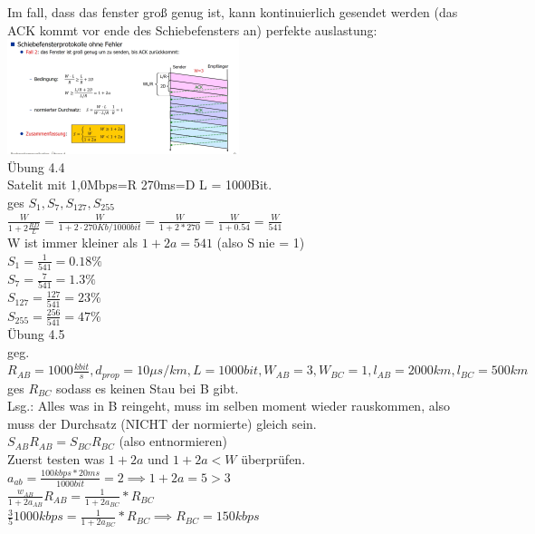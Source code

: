 \documentclass{article}
\begin{document}
	Im fall, dass das fenster groß genug ist, kann kontinuierlich gesendet werden (das ACK kommt vor ende des Schiebefensters an) perfekte auslastung:\\
	\includegraphics[width=256px]{GOBACKNlargeWindow.png}\\
	Übung 4.4\\
	Satelit mit 1,0Mbps=R 270ms=D L = 1000Bit.\\
	ges $S_1, S_7, S_{127},S_{255}$\\
	$\frac{W}{1+2\frac{RD}{L}} = \frac{W}{1+2\cdot 270Kb/1000bit} = \frac{W}{1+2*270}=\frac{W}{1+0.54} = \frac{W}{541}$\\
	W ist immer kleiner als $1+2a=541$ (also S nie = 1)\\
	$S_1 = \frac{1}{541} = 0.18\%$\\
	$S_7 = \frac{7}{541}= 1.3\%$\\
	$S_{127}= \frac{127}{541}= 23\%$\\
	$S_{255}= \frac{256}{541}=47\%$\\
	Übung 4.5\\
	geg.\\
	$R_{AB} = 1000\frac{kbit}{s}, d_{prop} = 10\mu s/km, L=1000bit, W_{AB} = 3, W_{BC}=1, l_{AB}=2000km, l_{BC} = 500km$\\
	ges $R_{BC}$ sodass es keinen Stau bei B gibt.\\
	Lsg.: Alles was in B reingeht, muss im selben moment wieder rauskommen, also muss der Durchsatz (NICHT der normierte) gleich sein.\\
	$S_{AB} R_{AB} = S_{BC}R_{BC}$ (also entnormieren)\\
	Zuerst testen was $1+2a$ und $1+2a<W$ überprüfen.\\
	$a_{ab} = \frac{100kbps*20ms}{1000bit} = 2\implies 1+2a = 5>3$\\
	$\frac{w_{AB}}{1+2a_{AB}}R_{AB}= \frac{1}{1+2a_{BC}}*R_{BC} $\\
	$\frac{3}{5}1000kbps= \frac{1}{1+2a_{BC}}*R_{BC}\implies R_{BC} = 150kbps$\\
\end{document}
